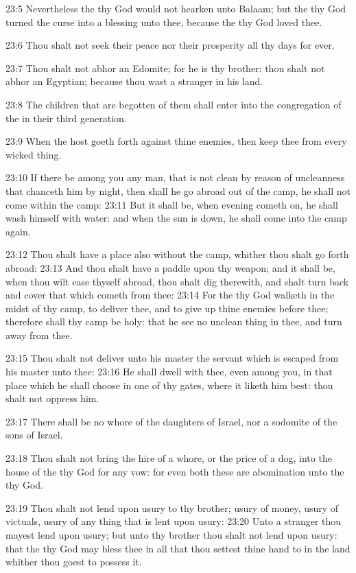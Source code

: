 23:5 Nevertheless the \LORD thy God would not hearken unto Balaam; but
the \LORD thy God turned the curse into a blessing unto thee, because
the \LORD thy God loved thee.

23:6 Thou shalt not seek their peace nor their prosperity all thy days
for ever.

23:7 Thou shalt not abhor an Edomite; for he is thy brother: thou
shalt not abhor an Egyptian; because thou wast a stranger in his land.

23:8 The children that are begotten of them shall enter into the
congregation of the \LORD in their third generation.

23:9 When the host goeth forth against thine enemies, then keep thee
from every wicked thing.

23:10 If there be among you any man, that is not clean by reason of
uncleanness that chanceth him by night, then shall he go abroad out of
the camp, he shall not come within the camp: 23:11 But it shall be,
when evening cometh on, he shall wash himself with water: and when the
sun is down, he shall come into the camp again.

23:12 Thou shalt have a place also without the camp, whither thou
shalt go forth abroad: 23:13 And thou shalt have a paddle upon thy
weapon; and it shall be, when thou wilt ease thyself abroad, thou
shalt dig therewith, and shalt turn back and cover that which cometh
from thee: 23:14 For the \LORD thy God walketh in the midst of thy
camp, to deliver thee, and to give up thine enemies before thee;
therefore shall thy camp be holy: that he see no unclean thing in
thee, and turn away from thee.

23:15 Thou shalt not deliver unto his master the servant which is
escaped from his master unto thee: 23:16 He shall dwell with thee,
even among you, in that place which he shall choose in one of thy
gates, where it liketh him best: thou shalt not oppress him.

23:17 There shall be no whore of the daughters of Israel, nor a
sodomite of the sons of Israel.

23:18 Thou shalt not bring the hire of a whore, or the price of a dog,
into the house of the \LORD thy God for any vow: for even both these
are abomination unto the \LORD thy God.

23:19 Thou shalt not lend upon usury to thy brother; usury of money,
usury of victuals, usury of any thing that is lent upon usury: 23:20
Unto a stranger thou mayest lend upon usury; but unto thy brother thou
shalt not lend upon usury: that the \LORD thy God may bless thee in all
that thou settest thine hand to in the land whither thou goest to
possess it.

